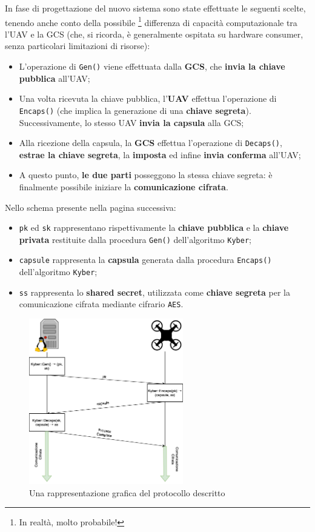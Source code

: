 \documentclass[a4paper, 12pt, oneside]{article}
\theoremstyle{definition}
\begin{document}
In fase di progettazione del nuovo sistema sono state effettuate le seguenti scelte, tenendo anche conto della possibile \footnote{In realtà, molto probabile!} differenza di capacità computazionale tra l'UAV e la GCS (che, si ricorda, è generalmente ospitata su hardware consumer, senza particolari limitazioni di risorse):

\begin{itemize}
    \item L'operazione di \texttt{Gen()} viene effettuata dalla \textbf{GCS}, che \textbf{invia la chiave pubblica} all'UAV;
    \item Una volta ricevuta la chiave pubblica, l'\textbf{UAV} effettua l'operazione di \texttt{Encaps()} (che implica la generazione di una \textbf{chiave segreta}). Successivamente, lo stesso UAV \textbf{invia la capsula} alla GCS;
    \item Alla ricezione della capsula, la \textbf{GCS} effettua l'operazione di \texttt{Decaps()}, \textbf{estrae la chiave segreta}, la \textbf{imposta} ed infine \textbf{invia conferma} all'UAV;
    \item A questo punto, \textbf{le due parti} posseggono la stessa chiave segreta: è finalmente possibile iniziare la \textbf{comunicazione cifrata}.
\end{itemize}

Nello schema presente nella pagina successiva:

\begin{itemize}
    \item \texttt{pk} ed \texttt{sk} rappresentano rispettivamente la \textbf{chiave pubblica} e la \textbf{chiave privata} restituite dalla procedura \texttt{Gen()} dell'algoritmo \texttt{Kyber};
    \item \texttt{capsule} rappresenta la \textbf{capsula} generata dalla procedura \texttt{Encaps()} dell'algoritmo \texttt{Kyber};
    \item \texttt{ss} rappresenta lo \textbf{shared secret}, utilizzata come \textbf{chiave segreta} per la comunicazione cifrata mediante cifrario \texttt{AES}.
\end{itemize}

\begin{figure}[H]
    \centering
    \includegraphics[width=0.6\textwidth]{images/key_exchange.png}
    \caption{Una rappresentazione grafica del protocollo descritto}
\end{figure}
\end{document}
